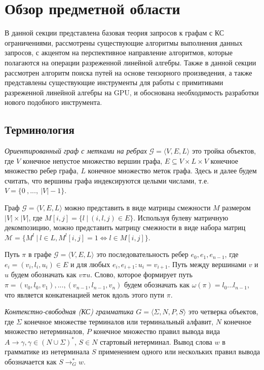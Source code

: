 \section{Обзор предметной области}

В данной секции представлена базовая теория запросов к графам с КС ограничениями,
рассмотрены существующие алгоритмы выполнения данных запросов, с акцентом на перспективное направление алгоритмов, которые полагаются на операции разреженной линейной алгебры. Также в данной секции рассмотрен алгоритм поиска путей на основе тензорного произведения, а также представлены существующие инструменты для работы с примитивами разреженной линейной алгебры на GPU, и обоснована необходимость разработки нового подобного инструмента.

\subsection{Терминология}

    
\textit{Ориентированный граф с метками на ребрах} $\mathcal{G} = \langle V, E, L \rangle$ это тройка объектов, где $V$ конечное непустое множество вершин графа, $E \subseteq V \times L \times V$ конечное множество ребер графа, $L$ конечное множество меток графа. Здесь и далее будем считать, что вершины графа индексируются целыми числами, т.е. $V = \{0~,...,~|V| - 1\}$.

Граф $\mathcal{G} = \langle V, E, L \rangle$ можно представить в виде матрицы смежности $M$ размером $|V| \times |V|$, где $M[i,j] = \{l~|~(i,l,j) \in E\}$. Используя булеву матричную декомпозицию, можно представить матрицу смежности в виде набора матриц $\mathcal{M} = \{ M^l ~|~ l \in L, M^l[i,j] = 1 \iff l \in M[i,j]\}$.

Путь $\pi$ в графе $\mathcal{G} = \langle V, E, L \rangle$ это последовательность ребер $e_0,e_1,e_{n-1}$, где $e_i = (v_i, l_i, u_i) \in E$ и для любых $e_i, e_{i+1}: u_i = v_{i+1}$. Путь между вершинами $v$ и $u$ будем обозначать как $v \pi u$. Слово, которое формирует путь $\pi = (v_0, l_0, v_1), ... ,(v_{n-1}, l_{n-1}, v_n)$ будем обозначать как $\omega (\pi) = l_0 ... l_{n-1}$, что является конкатенацией меток вдоль этого пути $\pi$.

\textit{Контекстно-свободная (КС) грамматика} $G = \langle \Sigma, N, P, S \rangle$ это четверка объектов, где $\Sigma$ конечное множестве терминалов или терминальный алфавит, $N$ конечное множество нетерминалов, $P$ конечное множество правил вывода вида $A \rightarrow \gamma, \gamma \in (N \cup \Sigma)^*$, $S \in N$ стартовый нетерминал. Вывод слова $w$ в грамматике из нетерминала $S$ применением одного или нескольких правил вывода обозначается как $S \rightarrow^*_G w$.

